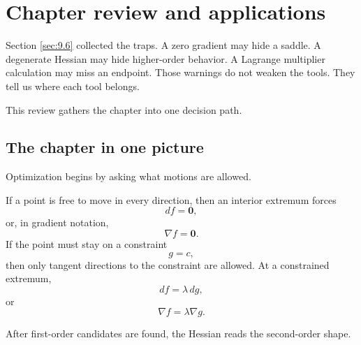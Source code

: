 \section{Chapter review and applications}
\label{sec:9.7}

Section \ref{sec:9.6} collected the traps.  A zero gradient may hide a saddle.  A
degenerate Hessian may hide higher-order behavior.  A Lagrange multiplier calculation
may miss an endpoint.  Those warnings do not weaken the tools.  They tell us where
each tool belongs.

This review gathers the chapter into one decision path.

\subsection{The chapter in one picture}

Optimization begins by asking what motions are allowed.

If a point is free to move in every direction, then an interior extremum forces
\[
    df=\mathbf 0,
\]
or, in gradient notation,
\[
    \nabla f=\mathbf 0.
\]
If the point must stay on a constraint
\[
    g=c,
\]
then only tangent directions to the constraint are allowed.  At a constrained extremum,
\[
    df=\lambda\,dg,
\]
or
\[
    \nabla f=\lambda\nabla g.
\]

After first-order candidates are found, the Hessian reads the second-order shape.

